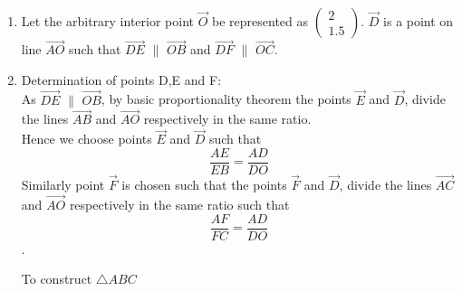 \begin{enumerate}
      
      
\item   Let the arbitrary interior point $\vec{O}$ be represented as $\begin{pmatrix}2\\1.5\end{pmatrix}$.    
    $\vec{D}$ is a point on line $\vec{AO}$ such that $\vec{DE}$ $\parallel$ $\vec{OB}$ \quad and \quad $\vec{DF}$  $\parallel$  $\vec{OC}$.\\
\item Determination of points D,E and F:\\
As $\vec{DE}$ $\parallel$ $\vec{OB}$, by basic proportionality theorem the points $\vec{E}$ and $\vec{D}$, divide the lines $\vec{AB}$ and $\vec{AO}$ respectively in the same ratio.\\ Hence we choose points $\vec{E}$ and $\vec{D}$ such that \begin{equation}\frac{AE}{EB} = \frac{AD}{DO}\end{equation} \quad Similarly point $\vec{F}$ is chosen such that the points $\vec{F}$ and $\vec{D}$, divide the lines $\vec{AC}$ and $\vec{AO}$ respectively in the same ratio such that \begin{equation}\frac{AF}{FC} = \frac{AD}{DO}\end{equation}.\\
  
  
  \begin{table}[ht]
    \begin{center}
    	
  \caption{To construct $\triangle ABC$}
   \label{table:table2}
   \end{center}	
\end{table}



\end{enumerate}
